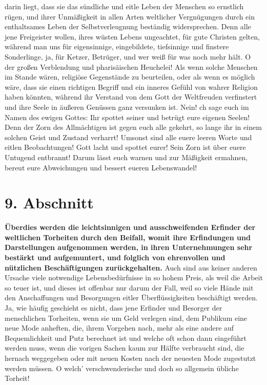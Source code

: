 {darin liegt, dass sie das sündliche und eitle Leben der Menschen so ernstlich
rügen, und ihrer Unmäßigkeit in allen Arten weltlicher Vergnügungen durch ein
enthaltsames Leben der Selbstverleugnung beständig widersprechen. Denn alle jene
Freigeister wollen, ihres wüsten Lebens
ungeachtet, für gute Christen gelten,
während man uns für eigensinnige, eingebildete, tiefsinnige und finstere
Sonderlinge, ja, für Ketzer, Betrüger, und wer weiß für
was noch mehr hält. O der großen Verblendung und pharisäischen Heuchelei! 
Als wenn solche Menschen im
Stande wären, religiöse Gegenstände zu beurteilen, oder als wenn es möglich
wäre, dass sie einen richtigen Begriff und ein inneres Gefühl von wahrer Religion
haben könnten, während ihr Verstand von dem Gott der Weltfreuden verfinstert
und ihre Seele in äußeren Genüssen ganz versunken ist. Nein! ch sage euch im
Namen des ewigen Gottes: Ihr spottet seiner und betrügt eure eigenen Seelen!
Denn der Zorn des Allmächtigen ist gegen euch alle gekehrt, so lange ihr in
einem solchen Geist und Zustand verharrt! Umsonst sind alle euere leeren Worte
und eitlen Beobachtungen! Gott lacht und spottet eurer! Sein Zorn ist über euere
Untugend entbrannt! Darum lässt euch warnen und zur Mäßigkeit ermahnen, bereut
eure Abweichungen und bessert eueren Lebenswandel!

\section{9. Abschnitt} \label{kap17_ab9}

\label{ref:17_09_bedarf_wecken}
\textbf{Überdies werden die leichtsinnigen und
ausschweifenden Erfinder der weltlichen
Torheiten durch den Beifall, womit ihre Erfindungen und Darstellungen
aufgenommen werden, in ihren Unternehmungen sehr bestärkt und aufgemuntert, und
folglich von ehrenvollen und nützlichen Beschäftigungen zurückgehalten.} Auch
sind aus keiner anderen Ursache viele notwendige Lebensbedürfnisse in so hohem
Preis, als weil die Arbeit so teuer ist, und dieses ist offenbar nur darum der
Fall, weil so viele Hände mit den Anschaffungen und Besorgungen eitler
Überflüssigkeiten beschäftigt werden. Ja, wie häufig geschieht es nicht, dass
jene Erfinder und Besorger der menschlichen Torheiten, wenn sie um Geld
verlegen sind, dem Publikum eine neue Mode anheften, die, ihrem Vorgehen nach,
mehr als eine andere auf Bequemlichkeit und Putz berechnet ist und welche oft
schon dann eingeführt werden muss, wenn die vorigen Sachen kaum zur Hälfte
verbraucht sind, die hernach weggegeben oder mit neuen Kosten nach der neuesten
Mode zugestutzt werden müssen. O welch' verschwenderische und doch so allgemein
übliche Torheit!

}
